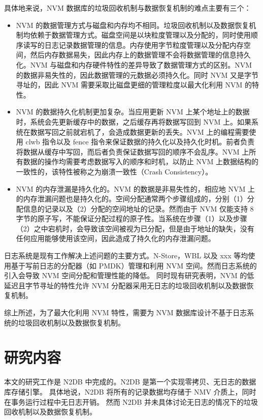 具体地来说，NVM 数据库的垃圾回收机制与数据恢复机制的难点主要有三个：
\begin{itemize}
    \item NVM 的数据管理方式与磁盘和内存均不相同。垃圾回收机制以及数据恢复机制均依赖于数据管理方式。磁盘空间是以块粒度管理以及分配的，同时使用顺序读写的日志记录数据管理的信息。内存使用字节粒度管理以及分配内存空间，然后内存数据易失，因此内存上的数据管理不会将数据管理的信息持久化。NVM 与磁盘和内存硬件特性的差异导致了数据管理方式的区别。NVM 的数据非易失性的，因此数据管理的元数据必须持久化。同时 NVM 又是字节寻址的，因此 NVM 需要采取比磁盘更细的管理粒度以最大化利用 NVM 的特性。
    \item NVM 的数据持久化机制更加复杂。当应用更新 NVM 上某个地址上的数据时，系统会先更新缓存中的数据，之后缓存再将数据写回到 NVM 上。如果系统在数据写回之前就宕机了，会造成数据更新的丢失。NVM 上的编程需要使用 clwb 指令以及 fence 指令来保证数据的持久化以及持久化时机。前者负责将数据从缓存中写回，而后者负责保证数据写回的顺序不会乱序。NVM 上所有数据的操作均需要考虑数据写入的顺序和时机，以防止 NVM 上数据结构的一致性的，该特性被称之为崩溃一致性（Crash Consistency）。
    \item NVM 的内存泄漏是持久化的。NVM 的数据是非易失性的，相应地 NVM 上的内存泄漏问题也是持久化的。空间分配通常两个步骤组成的，分别（1）分配信息的记录以及（2）分配的空间地址的记录。然而由于 NVM 仅能支持 8 字节的原子写，不能保证分配过程的原子性。当系统在步骤（1）以及步骤（2）之中宕机时，会导致该空间被视为已分配，但是由于地址的缺失，没有任何应用能够使用该空间，因此造成了持久化的内存泄漏问题。

\end{itemize}

日志系统是现有工作解决上述问题的主要方式。N-Store，WBL 以及 xxx 等均使用基于写前日志的分配器（如 PMDK\cite{}）管理和利用 NVM 空间。然而日志系统的引入会导致 NVM 空间分配和管理性能的降低。
同时现有研究表明，NVM 的低延迟且字节寻址的特性允许 NVM 分配器采用无日志的垃圾回收机制以及数据恢复机制\cite{ralloc}。

综上所述，为了最大化利用 NVM 特性，需要为 NVM 数据库设计不基于日志系统的垃圾回收机制以及数据恢复机制。

\section{研究内容}

本文的研究工作是 N2DB 中完成的。N2DB 是第一个实现零拷贝、无日志的数据库存储引擎。
具体地说，N2DB 将所有的记录数据均存储于 NMV 介质上，同时在事务运行过程中无日志开销。
然而 N2DB 并未具体讨论无日志的情况下的垃圾回收机制以及数据恢复机制。

